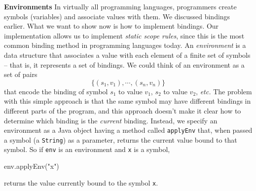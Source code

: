 \begin{minipage}[t]{\sw}
\slidenumber
\LARGE
{\bf Environments}\exx
In virtually all programming languages,
programmers create symbols (variables) and associate values with them.
We discussed bindings earlier.
What we want to show now is how to implement bindings.
Our implementation allows us to implement {\em static scope rules},
since this is the most common binding method in programming languages today.\exx
An {\em environment} is a data structure that associates a value
with each element of a finite set of symbols --
that is, it represents a set of bindings.
We could think of an environment as a set of pairs
\Large
\[\{(s_1,v_1),\cdots,(s_n,v_n)\}\]
\LARGE
that encode the binding of symbol $s_1$ to value $v_1$,
$s_2$ to value $v_2$, {\em etc.}
The problem with this simple approach is that
the same symbol may have different bindings
in different parts of the program,
and this approach doesn't make it clear
how to determine which binding is the {\em current} binding.\exx
Instead, we specify an environment as a Java object
having a method called \verb'applyEnv' that,
when passed a symbol (a \verb'String') as a parameter,
returns the current value bound to that symbol.
So if \verb'env' is an environment and \verb'x' is a symbol,
\Large
\begin{qv}
env.applyEnv("x")
\end{qv}
\LARGE
returns the value currently bound to the symbol \verb'x'.\exx
\end{minipage}
\clearpage
